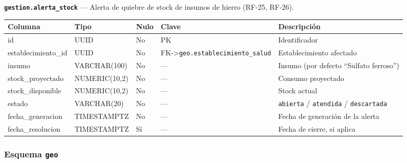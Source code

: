 \documentclass[11pt,a4paper]{article}
\begin{document}
\textbf{\texttt{gestion.alerta\_stock}} --- Alerta de quiebre de stock de insumos de hierro (RF-25, RF-26).

{\small
\begin{longtable}[]{@{}
  >{\raggedright\arraybackslash}p{}
  >{\raggedright\arraybackslash}p{}
  >{\raggedright\arraybackslash}p{}
  >{\raggedright\arraybackslash}p{}
  >{\raggedright\arraybackslash}p{}@{}}
\toprule\noalign{}
\begin{minipage}[b]{\linewidth}\raggedright
Columna
\end{minipage} & \begin{minipage}[b]{\linewidth}\raggedright
Tipo
\end{minipage} & \begin{minipage}[b]{\linewidth}\raggedright
Nulo
\end{minipage} & \begin{minipage}[b]{\linewidth}\raggedright
Clave
\end{minipage} & \begin{minipage}[b]{\linewidth}\raggedright
Descripción
\end{minipage} \\
\midrule\noalign{}
\endhead
\bottomrule\noalign{}
\endlastfoot
id & UUID & No & PK & Identificador \\
establecimiento\_id & UUID & No & FK-\textgreater{}\texttt{geo.establecimiento\_salud} & Establecimiento afectado \\
insumo & VARCHAR(100) & No & --- & Insumo (por defecto ``Sulfato ferroso'') \\
stock\_proyectado & NUMERIC(10,2) & No & --- & Consumo proyectado \\
stock\_disponible & NUMERIC(10,2) & No & --- & Stock actual \\
estado & VARCHAR(20) & No & --- & \texttt{abierta} / \texttt{atendida} / \texttt{descartada} \\
fecha\_generacion & TIMESTAMPTZ & No & --- & Fecha de generación de la alerta \\
fecha\_resolucion & TIMESTAMPTZ & Sí & --- & Fecha de cierre, si aplica \\
\end{longtable}
}

\subsubsection{\texorpdfstring{Esquema \texttt{geo}}{Esquema geo}}\label{esquema-geo}
\end{document}
